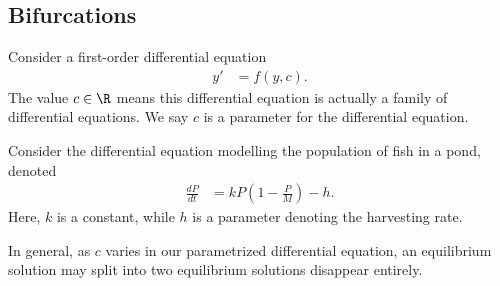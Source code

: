 \documentclass[10pt]{mypackage}
\begin{document}
\subsection{Bifurcations}%
Consider a first-order differential equation
\begin{align*}
  y' &= f\left(y,c\right).
\end{align*}
The value $c\in \R$ means this differential equation is actually a family of differential equations. We say $c$ is a parameter for the differential equation.
\begin{example}
  Consider the differential equation modelling the population of fish in a pond, denoted
  \begin{align*}
    \frac{dP}{dt} &= kP\left(1-\frac{P}{M}\right) - h.
  \end{align*}
  Here, $k$ is a constant, while $h$ is a parameter denoting the harvesting rate.
\end{example}
In general, as $c$ varies in our parametrized differential equation, an equilibrium solution may split into two equilibrium solutions disappear entirely.
\end{document}
